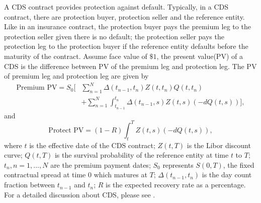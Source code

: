 \documentclass[11pt,a4paper]{article}
\theoremstyle{definition}
\numberwithin{equation}{section}
\begin{document}
	A CDS contract provides protection against default. Typically, in a CDS contract, there are protection buyer, protection seller and the reference entity. Like in an insurance contract, the protection buyer pays the premium leg to the protection seller given there is no default; the protection seller pays the protection leg to the protection buyer if the reference entity defaults before the maturity of the contract. 
	Assume face value of $\$1$, the present value(PV) of a CDS is the difference between PV of the premium leg  and protection leg. The PV of premium leg and protection leg are given by
	\begin{equation}
	\begin{split}
	\text{Premium PV} = S_0[&\sum_{n=1}^{N}\Delta(t_{n-1},t_n)Z(t,t_n)Q(t,t_n)\\
	&+\sum_{n=1}^{N}\int_{t_{n-1}}^{t_n}\Delta(t_{n-1},s)Z(t,s)(-dQ(t,s))
	],
	\end{split}
	\end{equation}
	and
	\begin{equation}
	\text{Protect PV} = (1-R)\int_{t}^{T}Z(t,s)(-dQ(t,s)),
	\end{equation}
	where $t$ is the effective date of the CDS contract; $Z(t,T)$ is the Libor discount curve; $Q(t,T)$ is the survival probability of the reference entity at time $t$ to $T$; $t_n, n = 1,...,N$ are the premium payment dates; $S_0$ represents $S(0,T)$, the fixed contractual spread at time 0 which matures at $T$; $\Delta(t_{n-1},t_n)$ is the day count fraction between $t_{n-1}$ and $t_n$; $R$ is the expected recovery rate as a percentage. For a detailed discussion about CDS, please see \cite[chapter 5]{okane}.
	
\end{document}
